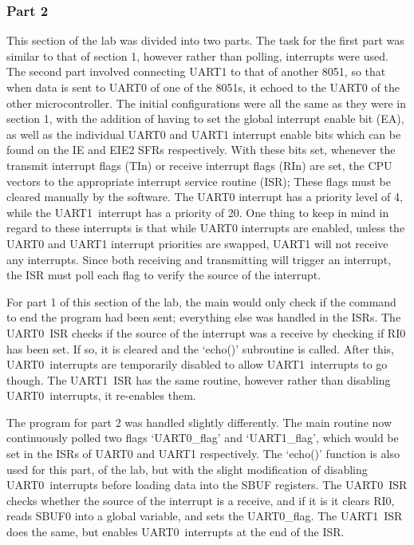 \documentclass[12pt]{article}
\newcommand{\uz}{UART0}
\newcommand{\uo}{UART1}
\begin{document}
\subsubsection{Part 2}
This section of the lab was divided into two parts.
The task for the first part was similar to that of section 1, however rather than polling, interrupts were used. The second part involved connecting UART1 to that of another 8051, so that when data is sent to UART0 of one of the 8051s, it echoed to the UART0 of the other microcontroller. The initial configurations were all the same as they were in section 1, with the addition of having to set the global interrupt enable bit (EA), as well as the individual UART0 and UART1 interrupt enable bits which can be found on the IE and EIE2 SFRs respectively. With these bits set, whenever the transmit interrupt flags (TIn) or receive interrupt flags (RIn) are set, the CPU vectors to the appropriate interrupt service routine (ISR); These flags must be cleared manually by the software. The UART0 interrupt has a priority level of 4, while the \uo\ interrupt has a priority of 20. One thing to keep in mind in regard to these interrupts is that while UART0 interrupts are enabled, unless the UART0 and UART1 interrupt priorities are swapped, UART1 will not receive any interrupts. Since both receiving and transmitting will trigger an interrupt, the ISR must poll each flag to verify the source of the interrupt. 

For part 1 of this section of the lab, the main would only check if the command to end the program had been sent; everything else was handled in the ISRs. The \uz\ ISR checks if the source of the interrupt was a receive by checking if RI0 has been set. If so, it is cleared and the `echo()' subroutine is called. After this, \uz\ interrupts are temporarily disabled to allow \uo\ interrupts to go though. The \uo\ ISR has the same routine, however rather than disabling \uz\ interrupts, it re-enables them.

The program for part 2 was handled slightly differently. The main routine now continuously polled two flags `UART0\_flag' and `UART1\_flag', which would be set in the ISRs of UART0 and UART1 respectively. The `echo()' function is also used for this part, of the lab, but with the slight modification of disabling \uz\ interrupts before loading data into the SBUF registers. The \uz\ ISR checks whether the source of the interrupt is a receive, and if it is it clears RI0, reads SBUF0 into a global variable, and sets the \uz\_flag. The \uo\ ISR does the same, but enables \uz\ interrupts at the end of the ISR. 
\end{document}
